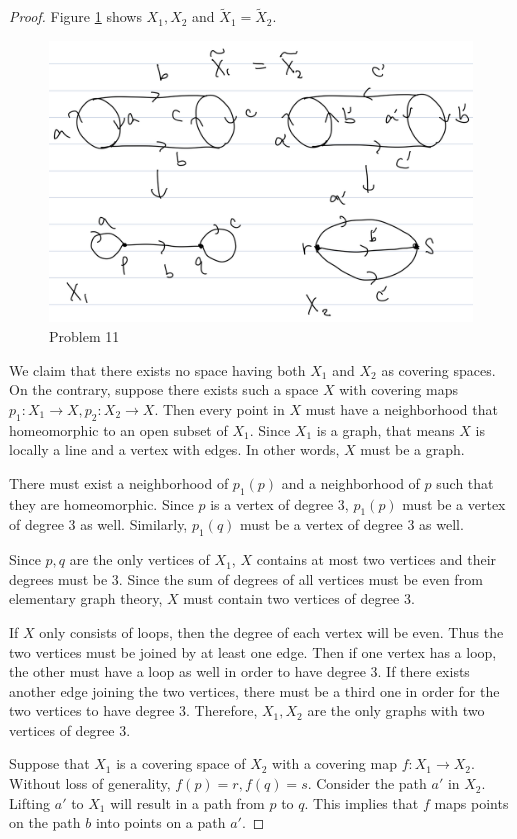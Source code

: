 \documentclass[12pt, psamsfonts]{amsart}
\theoremstyle{definition}
\theoremstyle{remark}
\numberwithin{equation}{section}
\begin{document}
\begin{proof}
  Figure \ref{fig:problem11} shows $X_1, X_2$ and $\tilde{X}_1 = \tilde{X}_2$.
  \begin{figure}
    \includegraphics[width=.5\linewidth]{problem11.jpeg}
    \caption{Problem 11}
    \label{fig:problem11}
  \end{figure}
  
  We claim that there exists no space having both $X_1$ and $X_2$ as covering spaces.
  On the contrary, suppose there exists such a space $X$ with covering maps $p_1: X_1 \rightarrow X, p_2: X_2 \rightarrow X$.
  Then every point in $X$ must have a neighborhood that homeomorphic to an open subset of $X_1$.
  Since $X_1$ is a graph, that means $X$ is locally a line and a vertex with edges.
  In other words, $X$ must be a graph.

  There must exist a neighborhood of $p_1(p)$ and a neighborhood of $p$ such that they are homeomorphic.
  Since $p$ is a vertex of degree 3, $p_1(p)$ must be a vertex of degree 3 as well.
  Similarly, $p_1(q)$ must be a vertex of degree 3 as well.

  Since $p, q$ are the only vertices of $X_1$, $X$ contains at most two vertices and their degrees must be 3.
  Since the sum of degrees of all vertices must be even from elementary graph theory, $X$ must contain two vertices of degree 3.

  If $X$ only consists of loops, then the degree of each vertex will be even.
  Thus the two vertices must be joined by at least one edge.
  Then if one vertex has a loop, the other must have a loop as well in order to have degree 3.
  If there exists another edge joining the two vertices, there must be a third one in order for the two vertices to have degree 3.
  Therefore, $X_1, X_2$ are the only graphs with two vertices of degree 3.

  Suppose that $X_1$ is a covering space of $X_2$ with a covering map $f: X_1 \rightarrow X_2$.
  Without loss of generality, $f(p) = r, f(q) = s$.
  Consider the path $a'$ in $X_2$.
  Lifting $a'$ to $X_1$ will result in a path from $p$ to $q$.
  This implies that $f$ maps points on the path $b$ into points on a path $a'$.
  

\end{proof}
\end{document}
